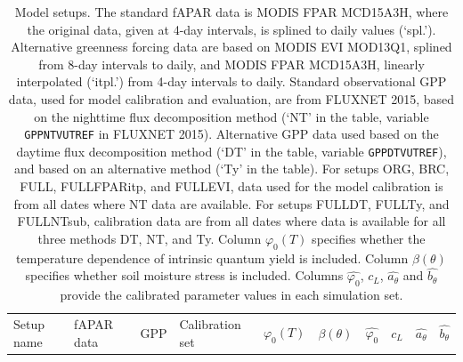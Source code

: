 \documentclass[gmd, manuscript]{copernicus}
\begin{document}
\begin{table}
\caption{Model setups. The standard fAPAR data is MODIS FPAR MCD15A3H, where the original data, given at 4-day intervals, is splined to daily values (`spl.'). Alternative greenness forcing data are based on MODIS EVI MOD13Q1, splined from 8-day intervals to daily, and MODIS FPAR MCD15A3H, linearly interpolated (`itpl.') from 4-day intervals to daily. Standard observational GPP data, used for model calibration and evaluation, are from FLUXNET 2015, based on the nighttime flux decomposition method (`NT' in the table, variable \texttt{GPP\textunderscore NT\textunderscore VUT\textunderscore REF} in FLUXNET 2015). Alternative GPP data used based on the daytime flux decomposition method (`DT' in the table, variable \texttt{GPP\textunderscore DT\textunderscore VUT\textunderscore REF}), and based on an alternative method \citep{wang17natpl} (`Ty' in the table). For setups ORG, BRC, FULL, FULL\textunderscore FPARitp, and FULL\textunderscore EVI, data used for the model calibration is from all dates where NT data are available. For setups FULL\textunderscore DT, FULL\textunderscore Ty, and FULL\textunderscore NTsub, calibration data are from all dates where data is available for all three methods DT, NT, and Ty. Column $\varphi_0(T)$ specifies whether the temperature dependence of intrinsic quantum yield is included. Column $\beta(\theta )$ specifies whether soil moisture stress is included. Columns $\widehat{\varphi_0}$, $\widehat{c_L}$, $\widehat{a_{\theta}}$ and  $\widehat{b_{\theta}}$ provide the calibrated parameter values in each simulation set.}
\begin{tabular}{llllllllll}
\tophline
    Setup name                 &  fAPAR data              &  GPP      &  Calibration set  &  $\varphi_0(T)$  &  $\beta(\theta )$  &  $\widehat{\varphi_0}$ &  $\widehat{c_L}$    &  $\widehat{a_{\theta}}$  &  $\widehat{b_{\theta}}$   \\

\end{tabular}
\end{table}
\end{document}

